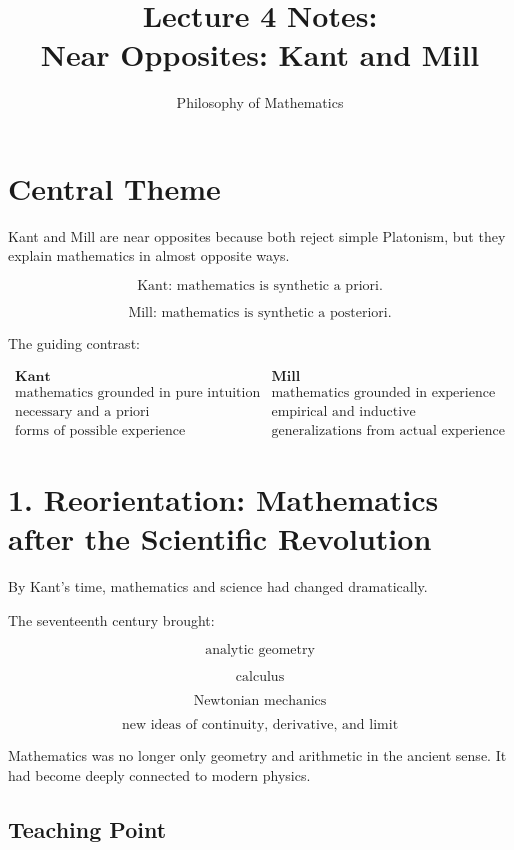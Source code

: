 \documentclass[11pt]{article}
\title{Lecture 4 Notes: \\ Near Opposites: Kant and Mill}
\author{Philosophy of Mathematics}
\date{}
\begin{document}
\maketitle

\section*{Central Theme}

Kant and Mill are near opposites because both reject simple Platonism, but they explain
mathematics in almost opposite ways.

\[
\boxed{
\text{Kant: mathematics is synthetic a priori.}
}
\]

\[
\boxed{
\text{Mill: mathematics is synthetic a posteriori.}
}
\]

The guiding contrast:

\[
\begin{array}{c|c}
\textbf{Kant} & \textbf{Mill} \\
\hline
\text{mathematics grounded in pure intuition} &
\text{mathematics grounded in experience} \\
\text{necessary and a priori} &
\text{empirical and inductive} \\
\text{forms of possible experience} &
\text{generalizations from actual experience}
\end{array}
\]

\section*{1. Reorientation: Mathematics after the Scientific Revolution}

By Kant's time, mathematics and science had changed dramatically.

The seventeenth century brought:

\[
\text{analytic geometry}
\]

\[
\text{calculus}
\]

\[
\text{Newtonian mechanics}
\]

\[
\text{new ideas of continuity, derivative, and limit}
\]

Mathematics was no longer only geometry and arithmetic in the ancient sense. It had
become deeply connected to modern physics.

\subsection*{Teaching Point}
\end{document}
